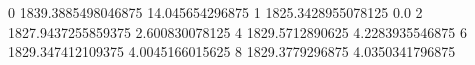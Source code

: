 0 1839.3885498046875 14.045654296875
1 1825.3428955078125 0.0
2 1827.9437255859375 2.600830078125
4 1829.5712890625 4.2283935546875
6 1829.347412109375 4.0045166015625
8 1829.3779296875 4.0350341796875
